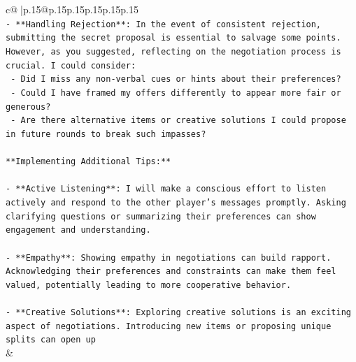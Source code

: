 \documentclass{article}
\begin{document}
{\begin{supertabular}{c@{$\;$}|p{.15\linewidth}@{}p{.15\linewidth}p{.15\linewidth}p{.15\linewidth}p{.15\linewidth}p{.15\linewidth}}
{{{\\ 
\texttt{{-} **Handling Rejection**: In the event of consistent rejection, submitting the secret proposal is essential to salvage some points. However, as you suggested, reflecting on the negotiation process is crucial. I could consider:} \\
\texttt{  {-} Did I miss any non{-}verbal cues or hints about their preferences?} \\
\texttt{  {-} Could I have framed my offers differently to appear more fair or generous?} \\
\texttt{  {-} Are there alternative items or creative solutions I could propose in future rounds to break such impasses?} \\
\\ 
\texttt{**Implementing Additional Tips:**} \\
\\ 
\texttt{{-} **Active Listening**: I will make a conscious effort to listen actively and respond to the other player's messages promptly. Asking clarifying questions or summarizing their preferences can show engagement and understanding.} \\
\\ 
\texttt{{-} **Empathy**: Showing empathy in negotiations can build rapport. Acknowledging their preferences and constraints can make them feel valued, potentially leading to more cooperative behavior.} \\
\\ 
\texttt{{-} **Creative Solutions**: Exploring creative solutions is an exciting aspect of negotiations. Introducing new items or proposing unique splits can open up} \\
            }
        }
    }
    & \\ \\


\end{supertabular}}
\end{document}
